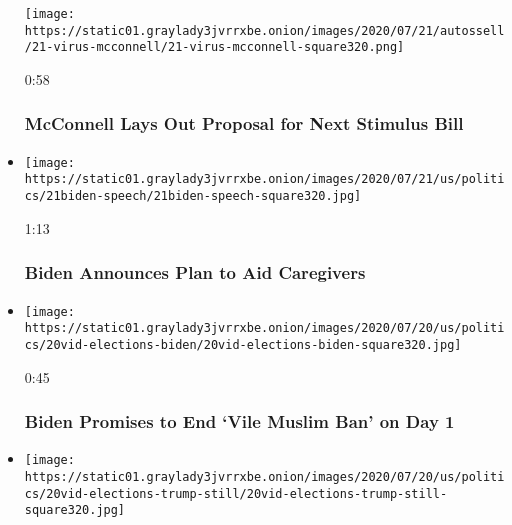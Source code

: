 \begin{itemize}
  \texttt{[image: https://static01.graylady3jvrrxbe.onion/images/2020/07/21/autossell/21-virus-mcconnell/21-virus-mcconnell-square320.png]}

  0:58

  \hypertarget{mcconnell-lays-out-proposal-for-next-stimulus-bill}{%
  \subsubsection{McConnell Lays Out Proposal for Next Stimulus
  Bill}\label{mcconnell-lays-out-proposal-for-next-stimulus-bill}}
\item
  \href{https://www.nytimes3xbfgragh.onion/video/us/100000007249436/biden-announces-plan-to-aid-caregivers.html?action=click\&module=video-series-bar\&region=header\&pgtype=Article\&playlistId=video/us-politics}{}

  \texttt{[image: https://static01.graylady3jvrrxbe.onion/images/2020/07/21/us/politics/21biden-speech/21biden-speech-square320.jpg]}

  1:13

  \hypertarget{biden-announces-plan-to-aid-caregivers}{%
  \subsubsection{Biden Announces Plan to Aid
  Caregivers}\label{biden-announces-plan-to-aid-caregivers}}
\item
  \href{https://www.nytimes3xbfgragh.onion/video/us/100000007248132/biden-muslim-voters.html?action=click\&module=video-series-bar\&region=header\&pgtype=Article\&playlistId=video/us-politics}{}

  \texttt{[image: https://static01.graylady3jvrrxbe.onion/images/2020/07/20/us/politics/20vid-elections-biden/20vid-elections-biden-square320.jpg]}

  0:45

  \hypertarget{biden-promises-to-end-vile-muslim-ban-on-day-1}{%
  \subsubsection{Biden Promises to End `Vile Muslim Ban' on Day
  1}\label{biden-promises-to-end-vile-muslim-ban-on-day-1}}
\item
  \href{https://www.nytimes3xbfgragh.onion/video/us/100000007247868/trump-deploy-federal-agents.html?action=click\&module=video-series-bar\&region=header\&pgtype=Article\&playlistId=video/us-politics}{}

  \texttt{[image: https://static01.graylady3jvrrxbe.onion/images/2020/07/20/us/politics/20vid-elections-trump-still/20vid-elections-trump-still-square320.jpg]}


\end{itemize}
